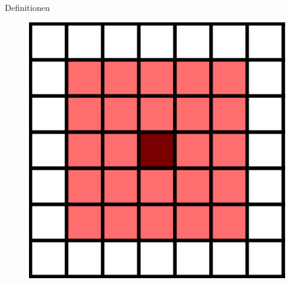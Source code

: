 \documentclass[aspectratio=169]{beamer}
\begin{document}
\begin{frame}{Definitionen}
\begin{multicols*}{2}
\begin{multicols*}{2}
        \begin{figure}[H]
          \centering
          \includegraphics[width = 0.28 \textheight]{moore_2.png}
        \end{figure}

      \end{multicols*}


      \vfill\null

      \pause



\end{multicols*}
\end{frame}
\end{document}
